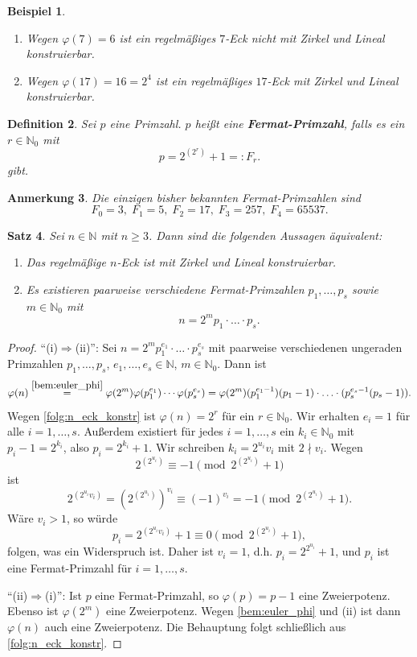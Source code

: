 \documentclass[a4paper, twoside, 11pt, ngerman]{report}
\newcommand{\NN}{\mathds N}
\theoremstyle{definistyle}
\newtheorem{satz}{Satz}[section]
\newtheorem{defini}[satz]{Definition}
\newtheorem{anm}[satz]{Anmerkung}
\newtheorem{bsp}[satz]{Beispiel}
\theoremstyle{remark}
\newcommand{\defn}[1]{\textit{\bfseries #1}}
\begin{document}
\begin{bsp}
\begin{enumerate}
\item[(a)] Wegen $\varphi(7) = 6 $ ist ein regelmäßiges $7$-Eck nicht mit Zirkel und Lineal konstruierbar.
\item[(b)] Wegen $\varphi(17) = 16 = 2^4 $ ist ein regelmäßiges $17$-Eck mit Zirkel und Lineal konstruierbar.
\end{enumerate}
\end{bsp}

\begin{defini}
Sei $p$ eine Primzahl. $p$ heißt eine \defn{Fermat-Primzahl}, falls es ein $r\in\NN_0$ mit
\[
p = 2^{(2^r)} + 1 =: F_r.
\]
gibt.
\end{defini}

\begin{anm}
Die einzigen bisher bekannten Fermat-Primzahlen sind
\[
F_0 = 3, \; F_1 = 5, \; F_2 = 17, \; F_3 = 257, \; F_4 = 65537.
\]
\end{anm}

\begin{satz}
Sei $n \in \NN$ mit $n \geq 3$. Dann sind die folgenden Aussagen äquivalent:
\begin{enumerate}
    \item[(i)] Das regelmäßige $n$-Eck ist mit Zirkel und Lineal konstruierbar.
    \item[(ii)] Es existieren paarweise verschiedene Fermat-Primzahlen $p_1, \dots, p_s$ sowie $m \in \NN_0$ mit
    \[
    n = 2^m p_1 \cdot\ldots\cdot p_s.
    \]
\end{enumerate}
\end{satz}

\begin{proof}
"`(i)$\Rightarrow$(ii)"': Sei $n = 2^m p_1^{e_1} \cdot\ldots\cdot p_s^{e_s}$ mit paarweise verschiedenen ungeraden Primzahlen $p_1,\ldots,p_s$, $e_1,\ldots,e_s\in\NN$, $m\in\NN_0$.
Dann ist
\[
\varphi(n) \overset{\ref{bem:euler_phi}}{=} \varphi(2^m) \varphi(p_1^{e_1}) \cdots \varphi(p_s^{e_s}) 
= \varphi(2^m)(p_1^{e_1-1})(p_1-1) \cdot\ldots\cdot (p_s^{e_s-1}(p_s-1)).
\]
Wegen \ref{folg:n_eck_konstr} ist $\varphi(n) = 2^r$ für ein $r \in \NN_0$.
Wir erhalten $e_i = 1$ für alle $i = 1, \dots, s$. Außerdem existiert für jedes $i=1,\ldots,s$ ein $k_i \in \NN_0$ mit $p_i - 1 = 2^{k_i}$, also $p_i = 2^{k_i} + 1$. Wir schreiben $k_i = 2^{u_i} v_i$ mit $2 \nmid v_i$. 
Wegen
\[
2^{(2^{u_i})}\equiv-1\pmod{2^{(2^{u_i})}+1}
\]
ist
\[
2^{(2^{u_i}v_i)}=(2^{(2^{u_i})})^{v_i}\equiv(-1)^{v_i}= -1\pmod{2^{(2^{u_i})}+1}.
\]
Wäre $v_i > 1$, so würde
\[
p_i = 2^{(2^{u_i} v_i)} + 1 \equiv 0 \pmod{2^{(2^{u_i})}+1},
\]
folgen, was ein Widerspruch ist. Daher ist $v_i = 1$, d.h. $p_i = 2^{2^{u_i}} + 1$, und $p_i$ ist eine Fermat-Primzahl für $i = 1, \dots, s$.

"`(ii)$\Rightarrow$(i)"': Ist $p$ eine Fermat-Primzahl, so $\varphi(p)=p-1$ eine Zweierpotenz.
Ebenso ist $\varphi(2^m)$ eine Zweierpotenz. Wegen \ref{bem:euler_phi} und (ii) ist dann $\varphi(n)$ auch eine Zweierpotenz. Die Behauptung folgt schließlich aus \ref{folg:n_eck_konstr}.
\end{proof}
\end{document}
